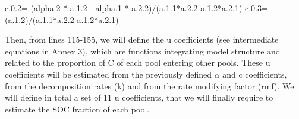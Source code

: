 \documentclass[
  10pt,
  b5paper,
]{book}
\newenvironment{Shaded}{\begin{snugshade}}{\end{snugshade}}
\newcommand{\FloatTok}[1]{\textcolor[rgb]{0.00,0.00,0.81}{#1}}
\newcommand{\NormalTok}[1]{#1}
\newcommand{\OtherTok}[1]{\textcolor[rgb]{0.56,0.35,0.01}{#1}}
\newcommand{\SpecialCharTok}[1]{\textcolor[rgb]{0.00,0.00,0.00}{#1}}
\begin{document}
\begin{Shaded}
\begin{Highlighting}[]
\NormalTok{  c.}\FloatTok{0.2}\OtherTok{=}\NormalTok{ (alpha}\FloatTok{.2} \SpecialCharTok{*}\NormalTok{ a.}\FloatTok{1.2} \SpecialCharTok{{-}}\NormalTok{ alpha}\FloatTok{.1} \SpecialCharTok{*}\NormalTok{ a.}\FloatTok{2.2}\NormalTok{)}\SpecialCharTok{/}\NormalTok{(a.}\FloatTok{1.1}\SpecialCharTok{*}\NormalTok{a.}\FloatTok{2.2}\SpecialCharTok{{-}}\NormalTok{a.}\FloatTok{1.2}\SpecialCharTok{*}\NormalTok{a.}\FloatTok{2.1}\NormalTok{)}
\NormalTok{  c.}\FloatTok{0.3}\OtherTok{=}\NormalTok{ (a.}\FloatTok{1.2}\NormalTok{)}\SpecialCharTok{/}\NormalTok{(a.}\FloatTok{1.1}\SpecialCharTok{*}\NormalTok{a.}\FloatTok{2.2}\SpecialCharTok{{-}}\NormalTok{a.}\FloatTok{1.2}\SpecialCharTok{*}\NormalTok{a.}\FloatTok{2.1}\NormalTok{)}
\end{Highlighting}
\end{Shaded}

Then, from lines 115-155, we will define the u coefficients (see intermediate equations in Annex 3), which are functions integrating model structure and related to the proportion of C of each pool entering other pools. These u coefficients will be estimated from the previously defined \(\alpha\) and c coefficients, from the decomposition rates (k) and from the rate modifying factor (rmf). We will define in total a set of 11 u coefficients, that we will finally require to estimate the SOC fraction of each pool.
\end{document}
